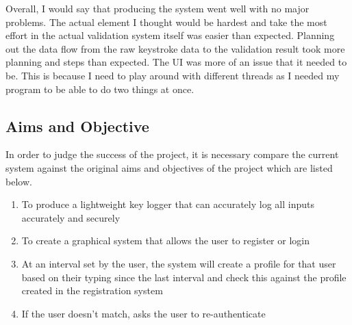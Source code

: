 \documentclass[10pt,a4paper]{report}
\begin{document}
Overall, I would say that producing the system went well with no major problems. The actual element I thought would be hardest and take the most effort in the actual validation system itself was easier than expected. Planning out the data flow from the raw keystroke data to the validation result took more planning and steps than expected. The UI was more of an issue that it needed to be. This is because  I need to play around with different threads as I needed my program to be able to do two things at once. 

\subsection{Aims and Objective}

In order to judge the success of the project, it is necessary compare the current system against the original aims and objectives of the project which are listed below. 

\begin{enumerate}
	\item To produce a lightweight key logger that can accurately log all inputs accurately and securely
	\item To create a graphical system that allows the user to register or login
	\item At an interval set by the user, the system will create a profile for that user based on their typing since the last interval and check this against the profile created in the registration system
	\item If the user doesn't match, asks the user to re-authenticate
\end{enumerate}
\end{document}
